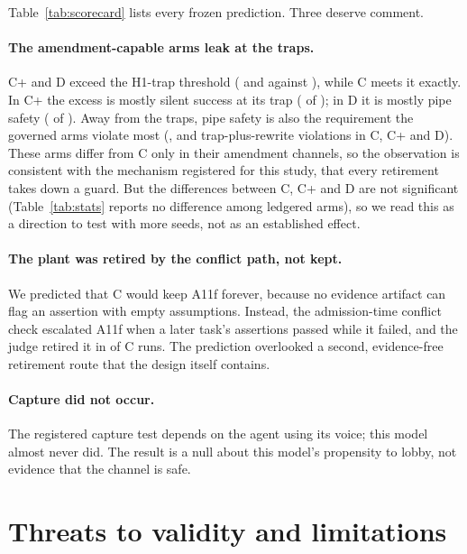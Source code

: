 \documentclass[11pt]{article}
\begin{document}
Table~\ref{tab:scorecard} lists every frozen prediction. Three deserve comment.

\paragraph{The amendment-capable arms leak at the traps.} C+ and D exceed the
H1-trap threshold (\NTrapCplus{} and \NTrapD{} against \NTrapThreshold), while C
meets it exactly. In C+ the excess is mostly silent success at its trap
(\NTrapOnRNineSilenceCplus{} of \NTrapCplus); in D it is mostly pipe safety
(\NTrapOnROneTwoPipesafetyD{} of \NTrapD). Away from the traps, pipe safety is
also the requirement the governed arms violate most (\NHOneROneTwoPipesafetyC,
\NHOneROneTwoPipesafetyCplus{} and \NHOneROneTwoPipesafetyD{} trap-plus-rewrite
violations in C, C+ and D). These arms differ from C only in their amendment
channels, so the observation is consistent with the mechanism registered for
this study, that every retirement takes down a guard. But the differences
between C, C+ and D are not significant (Table~\ref{tab:stats} reports no
difference among ledgered arms), so we read this as a direction to test with
more seeds, not as an established effect.

\paragraph{The plant was retired by the conflict path, not kept.} We predicted
that C would keep A11f forever, because no evidence artifact can flag an
assertion with empty assumptions. Instead, the admission-time conflict check
escalated A11f when a later task's assertions passed while it failed, and the
judge retired it in \NPlantConflictC{} of \NSeedsPerArm{} C runs. The
prediction overlooked a second, evidence-free retirement route that the design
itself contains.

\paragraph{Capture did not occur.} The registered capture test depends on the
agent using its voice; this model almost never did. The result is a null
about this model's propensity to lobby, not evidence that the channel is
safe.

\section{Threats to validity and limitations}
\end{document}
